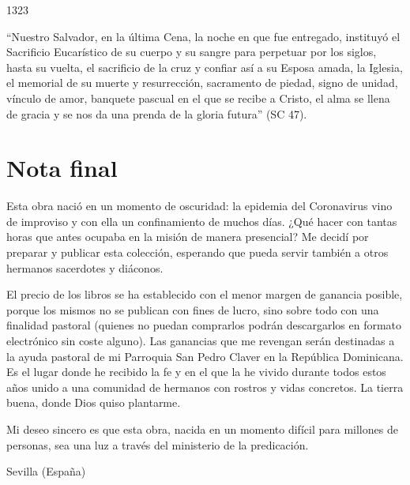 			\begin{ccebody}\begin{ccenumber}1323\end{ccenumber} “Nuestro Salvador, en la última Cena, la noche en que fue entregado, instituyó el Sacrificio Eucarístico de su cuerpo y su sangre para perpetuar por los siglos, hasta su vuelta, el sacrificio de la cruz y confiar así a su Esposa amada, la Iglesia, el memorial de su muerte y resurrección, sacramento de piedad, signo de unidad, vínculo de amor, banquete pascual en el que se recibe a Cristo, el alma se llena de gracia y se nos da una prenda de la gloria futura” (SC 47).\end{ccebody}
			
			\chapter{Nota final}
			
			\begin{bodyintro}Esta obra nació en un momento de oscuridad: la epidemia del Coronavirus vino de improviso y con ella un confinamiento de muchos días. ¿Qué hacer con tantas horas que antes ocupaba en la misión de manera presencial? Me decidí por preparar y publicar esta colección, esperando que pueda servir también a otros hermanos sacerdotes y diáconos.\end{bodyintro}
			
			\begin{bodyintro}El precio de los libros se ha establecido con el menor margen de ganancia posible, porque los mismos no se publican con fines de lucro, sino sobre todo con una finalidad pastoral (quienes no puedan comprarlos podrán descargarlos en formato electrónico sin coste alguno). Las ganancias que me revengan serán destinadas a la ayuda pastoral de mi Parroquia San Pedro Claver en la República Dominicana. Es el lugar donde he recibido la fe y en el que la he vivido durante todos estos años unido a una comunidad de hermanos con rostros y vidas concretos. La tierra buena, donde Dios quiso plantarme.\end{bodyintro}
			
			\begin{bodyintro}Mi deseo sincero es que esta obra, nacida en un momento difícil para millones de personas, sea una luz a través del ministerio de la predicación.\end{bodyintro}
			
			\begin{referencia}Sevilla (España)\end{referencia}
			

